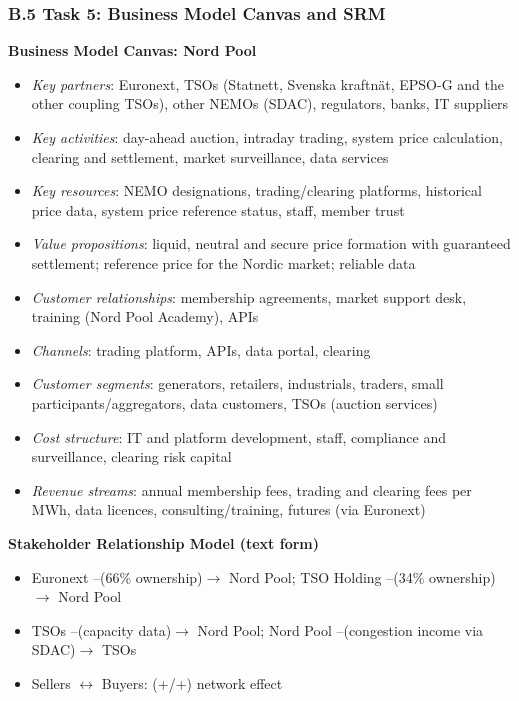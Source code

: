 \subsubsection*{B.5 Task 5: Business Model Canvas and SRM}
\label{app:B5}
\begin{aiout}
\textbf{Business Model Canvas: Nord Pool}
\begin{itemize}
  \item \emph{Key partners}: Euronext, TSOs (Statnett, Svenska kraftnät, EPSO-G and the other coupling TSOs), other NEMOs (SDAC), regulators, banks, IT suppliers
  \item \emph{Key activities}: day-ahead auction, intraday trading, system price calculation, clearing and settlement, market surveillance, data services
  \item \emph{Key resources}: NEMO designations, trading/clearing platforms, historical price data, system price reference status, staff, member trust
  \item \emph{Value propositions}: liquid, neutral and secure price formation with guaranteed settlement; reference price for the Nordic market; reliable data
  \item \emph{Customer relationships}: membership agreements, market support desk, training (Nord Pool Academy), APIs
  \item \emph{Channels}: trading platform, APIs, data portal, clearing
  \item \emph{Customer segments}: generators, retailers, industrials, traders, small participants/aggregators, data customers, TSOs (auction services)
  \item \emph{Cost structure}: IT and platform development, staff, compliance and surveillance, clearing risk capital
  \item \emph{Revenue streams}: annual membership fees, trading and clearing fees per MWh, data licences, consulting/training, futures (via Euronext)
\end{itemize}
\textbf{Stakeholder Relationship Model (text form)}
\begin{itemize}
  \item Euronext --(66\% ownership)$\rightarrow$ Nord Pool; TSO Holding --(34\% ownership)$\rightarrow$ Nord Pool
  \item TSOs --(capacity data)$\rightarrow$ Nord Pool; Nord Pool --(congestion income via SDAC)$\rightarrow$ TSOs
  \item Sellers $\leftrightarrow$ Buyers: (+/+) network effect

\end{itemize}
\end{aiout}
